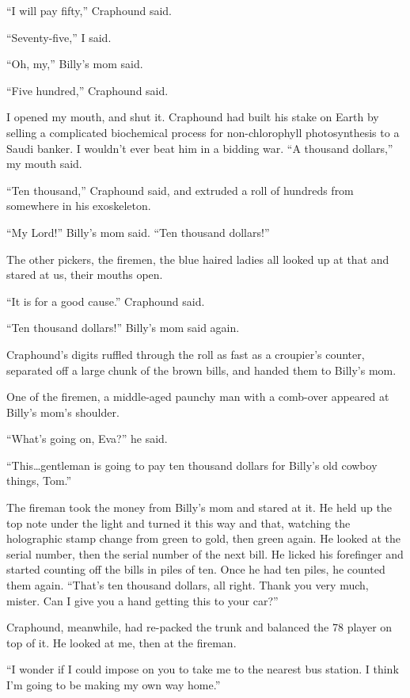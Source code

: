 ``I will pay fifty,'' Craphound said.

``Seventy-five,'' I said.

``Oh, my,'' Billy's mom said.

``Five hundred,'' Craphound said.

I opened my mouth, and shut it. Craphound had built his stake on
Earth by selling a complicated biochemical process for
non-chlorophyll photosynthesis to a Saudi banker. I wouldn't ever
beat him in a bidding war. ``A thousand dollars,'' my mouth said.

``Ten thousand,'' Craphound said, and extruded a roll of hundreds
from somewhere in his exoskeleton.

``My Lord!'' Billy's mom said. ``Ten thousand dollars!''

The other pickers, the firemen, the blue haired ladies all looked
up at that and stared at us, their mouths open.

``It is for a good cause.'' Craphound said.

``Ten thousand dollars!'' Billy's mom said again.

Craphound's digits ruffled through the roll as fast as a croupier's
counter, separated off a large chunk of the brown bills, and handed
them to Billy's mom.

One of the firemen, a middle-aged paunchy man with a comb-over
appeared at Billy's mom's shoulder.

``What's going on, Eva?'' he said.

``This\ldots{}gentleman is going to pay ten thousand dollars for Billy's 
old cowboy things, Tom.''

The fireman took the money from Billy's mom and stared at it. He
held up the top note under the light and turned it this way and
that, watching the holographic stamp change from green to gold,
then green again. He looked at the serial number, then the serial
number of the next bill. He licked his forefinger and started
counting off the bills in piles of ten. Once he had ten piles, he
counted them again.
``That's ten thousand dollars, all right. Thank you very much, mister. 
Can I give you a hand getting this to your car?''

Craphound, meanwhile, had re-packed the trunk and balanced the 78
player on top of it. He looked at me, then at the fireman.

``I wonder if I could impose on you to take me to the nearest bus station. 
I think I'm going to be making my own way home.''

